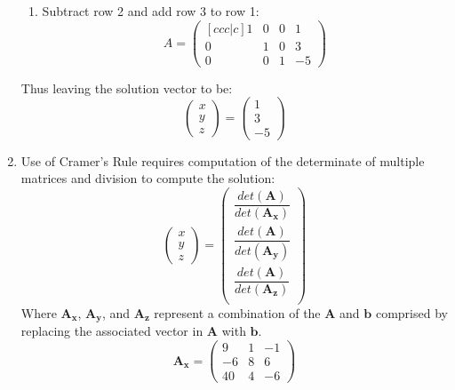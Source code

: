 \begin{enumerate}
\begin{enumerate}
		\item Subtract row 2 and add row 3 to row 1:
			\begin{equation*}A=
				\begin{pmatrix}[ccc|c]
					1&0&0&1\\0&1&0&3\\0&0&1&-5
			\end{pmatrix}
			\end{equation*}		
	\end{enumerate}
	Thus leaving the solution vector to be:
	\begin{equation*}
	\boxed{
		\begin{pmatrix} 
		x\\y\\z
		\end{pmatrix}
		=
		\begin{pmatrix}
		1\\3\\-5
		\end{pmatrix}}
	\end{equation*}
	\item Use of Cramer's Rule requires computation of the determinate of multiple matrices and division to compute the solution:
\begin{equation}
	\begin{pmatrix}
		x\\y\\z
	\end{pmatrix}
	=
	\begin{pmatrix}
		\dfrac{det(\boldsymbol{A})}{det(\boldsymbol{A_x})} \\
		\dfrac{det(\boldsymbol{A})}{det(\boldsymbol{A_y})} \\
		\dfrac{det(\boldsymbol{A})}{det(\boldsymbol{A_z})} \\
	\end{pmatrix}
	\label{eq:sol}
\end{equation}
Where $\boldsymbol{A_x}$, $\boldsymbol{A_y}$, and $\boldsymbol{A_z}$ represent a combination of the $\boldsymbol{A}$ and $\boldsymbol{b}$ comprised by replacing the associated vector in $\boldsymbol{A}$ with $\boldsymbol{b}$. 
\begin{equation*}
	\boldsymbol{A_x}=
	\begin{pmatrix}
		9&1&-1\\-6&8&6\\40&4&-6
	\end{pmatrix}
\end{equation*}
\begin{equation*}

\end{equation*}
\end{enumerate}
